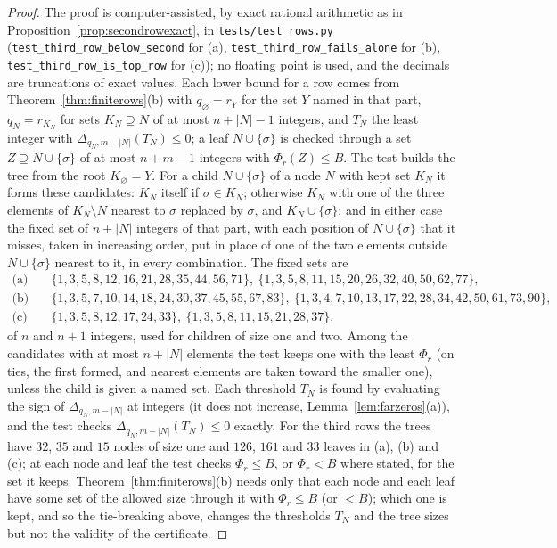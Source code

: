 \documentclass[11pt]{article}
\begin{document}
\begin{proof}
The proof is computer-assisted, by exact rational arithmetic as in
Proposition~\ref{prop:secondrowexact}, in \texttt{tests/test\_rows.py}
(\texttt{test\_third\_row\_below\_second} for (a),
\texttt{test\_third\_row\_fails\_alone} for (b),
\texttt{test\_third\_row\_is\_top\_row} for (c)); no floating point is
used, and the decimals are truncations of exact values.  Each lower bound for a row comes from
Theorem~\ref{thm:finiterows}(b) with $q_\varnothing=r_Y$ for the set $Y$
named in that part, $q_N=r_{K_N}$ for sets $K_N\supseteq N$ of at most
$n+|N|-1$ integers, and $T_N$ the least integer with
$\Delta_{q_N,m-|N|}(T_N)\le0$; a leaf $N\cup\{\sigma\}$ is checked through a
set $Z\supseteq N\cup\{\sigma\}$ of at most $n+m-1$ integers with
$\Phi_r(Z)\le B$.  The test builds the tree from the root
$K_\varnothing=Y$.  For a child $N\cup\{\sigma\}$ of a node $N$ with kept
set $K_N$ it forms these candidates: $K_N$ itself if $\sigma\in K_N$;
otherwise $K_N$ with one of the three elements of $K_N\setminus N$ nearest
to $\sigma$ replaced by $\sigma$, and $K_N\cup\{\sigma\}$; and in either
case the fixed set of $n+|N|$ integers of that part, with each position of
$N\cup\{\sigma\}$ that it misses, taken in increasing order, put in place of
one of the two elements outside $N\cup\{\sigma\}$ nearest to it, in every
combination.  The fixed sets are
\begin{align*}
  \text{(a)}\quad&\{1,3,5,8,12,16,21,28,35,44,56,71\},\
  \{1,3,5,8,11,15,20,26,32,40,50,62,77\},\\
  \text{(b)}\quad&\{1,3,5,7,10,14,18,24,30,37,45,55,67,83\},\
  \{1,3,4,7,10,13,17,22,28,34,42,50,61,73,90\},\\
  \text{(c)}\quad&\{1,3,5,8,12,17,24,33\},\ \{1,3,5,8,11,15,21,28,37\},
\end{align*}
of $n$ and $n+1$ integers, used for children of size one and two.  Among
the candidates with at most $n+|N|$ elements the test keeps one with the
least $\Phi_r$ (on ties, the first formed, and nearest elements are taken
toward the smaller one), unless the child is given a named set.  Each
threshold $T_N$ is found by evaluating the sign of $\Delta_{q_N,m-|N|}$ at
integers (it does not increase, Lemma~\ref{lem:farzeros}(a)), and the test
checks $\Delta_{q_N,m-|N|}(T_N)\le0$ exactly.  For the third rows the trees
have $32$, $35$ and $15$ nodes of size one and $126$, $161$ and $33$ leaves
in (a), (b) and (c); at each node and leaf the test checks $\Phi_r\le B$,
or $\Phi_r<B$ where stated, for the set it keeps.  Theorem~\ref{thm:finiterows}(b)
needs only that each node and each leaf have some set of the allowed size
through it with $\Phi_r\le B$ (or $<B$); which one is kept, and so the
tie-breaking above, changes the thresholds $T_N$ and the tree sizes but not
the validity of the certificate.


\end{proof}
\end{document}
